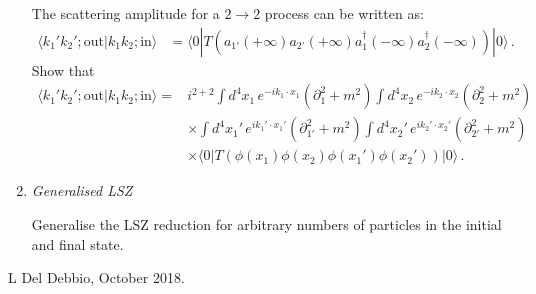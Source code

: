 \documentclass[12pt,a4paper]{article}
\begin{document}
\begin{enumerate}
    The scattering amplitude for a $2\rightarrow 2$ process can be
    written as: 
    \begin{align}
      \label{eq:4}
      \langle k_1' k_2';\mathrm{out} | k_1 k_2; \mathrm{in} \rangle 
      &= \langle 0 | T\left(
        a_{1'}(+\infty) a_{2'}(+\infty) 
        a_1^\dagger(-\infty) a_2^\dagger(-\infty)
        \right) |0 \rangle\, .
    \end{align}
    Show that
    \begin{align}
      \label{eq:5}
      \langle k_1' k_2';\mathrm{out} | k_1 k_2; \mathrm{in} \rangle 
      =&  i^{2+2} 
         \int d^4x_1\, e^{-i k_1\cdot x_1} \left(\partial_1^2 + m^2\right)  
         \int d^4x_2\, e^{-i k_2\cdot x_2} \left(\partial_2^2 +
         m^2\right)  \nonumber \\
      & \times \int d^4x_1'\, e^{i k_1'\cdot x_1'} \left(\partial_{1'}^2 + m^2\right)  
         \int d^4x_2'\, e^{i k_2'\cdot x_2'} \left(\partial_{2'}^2 +
        m^2\right) \nonumber \\
      & \times \langle 0 | T\left(
        \phi(x_1) \phi(x_2) \phi(x_1') \phi(x_2')
        \right) |0 \rangle\, .        
    \end{align}

\item {\it Generalised LSZ}

  Generalise the LSZ reduction for arbitrary numbers of particles in
  the initial and final state. 

\end{enumerate}

\vfill
\hspace*{\fill}\tiny L Del Debbio, October 2018.
\end{document}
